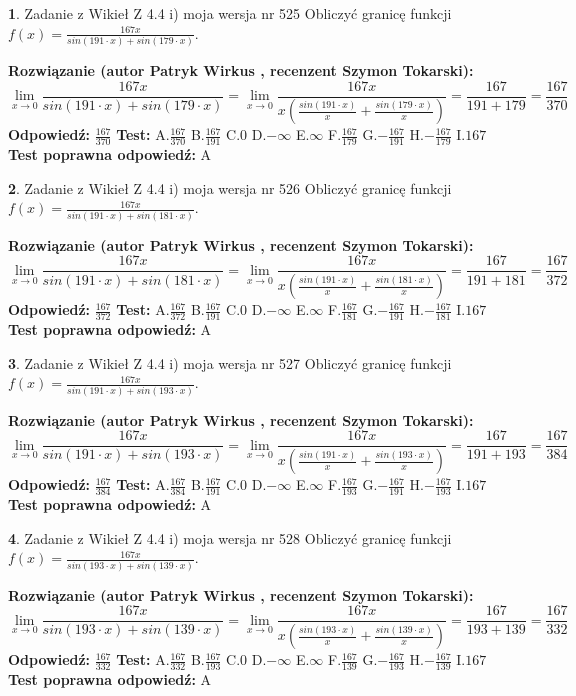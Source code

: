 \documentclass[12pt, a4paper]{article}
\theoremstyle{definition} %
\newtheorem{zad}{}
\newcommand{\zadStart}[1]{\begin{zad}#1\newline}
\newcommand{\zadStop}{\end{zad}}
\newcommand{\rozwStart}[2]{\noindent \textbf{Rozwiązanie (autor #1 , recenzent #2): }\newline}
\newcommand{\rozwStop}{\newline}
\newcommand{\odpStart}{\noindent \textbf{Odpowiedź:}\newline}
\newcommand{\odpStop}{\newline}
\newcommand{\testStart}{\noindent \textbf{Test:}\newline}
\newcommand{\testStop}{\newline}
\newcommand{\kluczStart}{\noindent \textbf{Test poprawna odpowiedź:}\newline}
\newcommand{\kluczStop}{\newline}
\begin{document}
\zadStart{Zadanie z Wikieł Z 4.4 i) moja wersja nr 525}
Obliczyć granicę funkcji $f(x)=\frac{167x}{sin(191\cdot x) +sin(179\cdot x)}$.
\zadStop
\rozwStart{Patryk Wirkus}{Szymon Tokarski}
$$\lim\limits_{x\to 0}\frac{167x}{sin(191\cdot x) +sin(179\cdot x)}=\lim\limits_{x\to 0}\frac{167x}{x(\frac{sin(191\cdot x)}{x}+\frac{sin(179\cdot x)}{x})}=\frac{167}{191+179} = \frac{167}{370}$$
\rozwStop
\odpStart
$\frac{167}{370}$
\odpStop
\testStart
A.$\frac{167}{370}$
B.$\frac{167}{191}$
C.$0$
D.$-\infty$
E.$\infty$
F.$\frac{167}{179}$
G.$-\frac{167}{191}$
H.$-\frac{167}{179}$
I.$167$
\testStop
\kluczStart
A
\kluczStop



\zadStart{Zadanie z Wikieł Z 4.4 i) moja wersja nr 526}
Obliczyć granicę funkcji $f(x)=\frac{167x}{sin(191\cdot x) +sin(181\cdot x)}$.
\zadStop
\rozwStart{Patryk Wirkus}{Szymon Tokarski}
$$\lim\limits_{x\to 0}\frac{167x}{sin(191\cdot x) +sin(181\cdot x)}=\lim\limits_{x\to 0}\frac{167x}{x(\frac{sin(191\cdot x)}{x}+\frac{sin(181\cdot x)}{x})}=\frac{167}{191+181} = \frac{167}{372}$$
\rozwStop
\odpStart
$\frac{167}{372}$
\odpStop
\testStart
A.$\frac{167}{372}$
B.$\frac{167}{191}$
C.$0$
D.$-\infty$
E.$\infty$
F.$\frac{167}{181}$
G.$-\frac{167}{191}$
H.$-\frac{167}{181}$
I.$167$
\testStop
\kluczStart
A
\kluczStop



\zadStart{Zadanie z Wikieł Z 4.4 i) moja wersja nr 527}
Obliczyć granicę funkcji $f(x)=\frac{167x}{sin(191\cdot x) +sin(193\cdot x)}$.
\zadStop
\rozwStart{Patryk Wirkus}{Szymon Tokarski}
$$\lim\limits_{x\to 0}\frac{167x}{sin(191\cdot x) +sin(193\cdot x)}=\lim\limits_{x\to 0}\frac{167x}{x(\frac{sin(191\cdot x)}{x}+\frac{sin(193\cdot x)}{x})}=\frac{167}{191+193} = \frac{167}{384}$$
\rozwStop
\odpStart
$\frac{167}{384}$
\odpStop
\testStart
A.$\frac{167}{384}$
B.$\frac{167}{191}$
C.$0$
D.$-\infty$
E.$\infty$
F.$\frac{167}{193}$
G.$-\frac{167}{191}$
H.$-\frac{167}{193}$
I.$167$
\testStop
\kluczStart
A
\kluczStop



\zadStart{Zadanie z Wikieł Z 4.4 i) moja wersja nr 528}
Obliczyć granicę funkcji $f(x)=\frac{167x}{sin(193\cdot x) +sin(139\cdot x)}$.
\zadStop
\rozwStart{Patryk Wirkus}{Szymon Tokarski}
$$\lim\limits_{x\to 0}\frac{167x}{sin(193\cdot x) +sin(139\cdot x)}=\lim\limits_{x\to 0}\frac{167x}{x(\frac{sin(193\cdot x)}{x}+\frac{sin(139\cdot x)}{x})}=\frac{167}{193+139} = \frac{167}{332}$$
\rozwStop
\odpStart
$\frac{167}{332}$
\odpStop
\testStart
A.$\frac{167}{332}$
B.$\frac{167}{193}$
C.$0$
D.$-\infty$
E.$\infty$
F.$\frac{167}{139}$
G.$-\frac{167}{193}$
H.$-\frac{167}{139}$
I.$167$
\testStop
\kluczStart
A
\kluczStop
\end{document}
